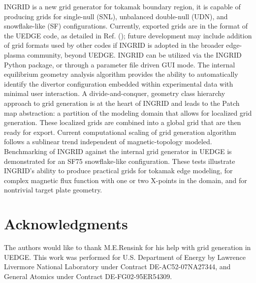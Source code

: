 INGRID is a new grid generator for tokamak boundary region, it is
capable of producing grids for single-null (SNL), unbalanced
double-null (UDN), and snowflake-like (SF) configurations. Currently,
exported grids are in the format of the UEDGE code, as detailed in
Ref. (\cite{Rensink2017}); future development may include addition of
grid formats used by other codes if INGRID is adopted in the broader
edge-plasma community, beyond UEDGE. INGRID can be utilized via the
INGRID Python package, or through a parameter file driven GUI
mode. The internal equilibrium geometry analysis algorithm provides
the ability to automatically identify the divertor configuration
embedded within experimental data with minimal user interaction. A
divide-and-conquer, geometry class hierarchy approach to grid
generation is at the heart of INGRID and leads to the Patch map
abstraction: a partition of the modeling domain that allows for
localized grid generation. These localized grids are combined into a
global grid that are then ready for export. Current computational
scaling of grid generation algorithm follows a sublinear trend
independent of magnetic-topology modeled. Benchmarking of INGRID
against the internal grid generator in UEDGE is demonstrated for an
SF75 snowflake-like configuration. These tests illustrate INGRID's
ability to produce practical grids for tokamak edge modeling, for
complex magnetic flux function with one or two X-points in the domain,
and for nontrivial target plate geometry.


\section{Acknowledgments}
The authors would like to thank M.E.Rensink for his help with grid
generation in UEDGE. This work was performed for U.S. Department of
Energy by Lawrence Livermore National Laboratory under Contract
DE-AC52-07NA27344, and General Atomics under Contract DE-FG02-95ER54309.
